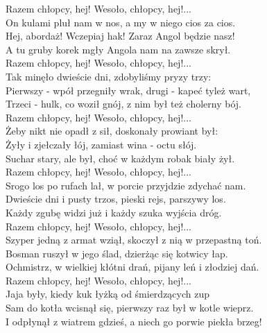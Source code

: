 Razem chłopcy, hej! Wesoło, chłopcy, hej!... \\

On kulami pluł nam w nos, a my w niego cios za cios. \\
Hej, abordaż! Wczepiaj hak! Zaraz Angol będzie nasz! \\
A tu gruby korek mgły Angola nam na zawsze skrył. \\

Razem chłopcy, hej! Wesoło, chłopcy, hej!... \\

Tak minęło dwieście dni, zdobyliśmy pryzy trzy: \\
Pierwszy - wpół przegniły wrak, drugi - kapeć tyleż wart, \\
Trzeci - hulk, co woził gnój, z nim był też cholerny bój. \\

Razem chłopcy, hej! Wesoło, chłopcy, hej!... \\

Żeby nikt nie opadł z sił, doskonały prowiant był: \\
Żyły i zjełczały łój, zamiast wina - octu słój. \\
Suchar stary, ale był, choć w każdym robak biały żył. \\

Razem chłopcy, hej! Wesoło, chłopcy, hej!... \\

Srogo los po rufach lał, w porcie przyjdzie zdychać nam. \\
Dwieście dni i pusty trzos, pieski rejs, parszywy los. \\
Każdy zgubę widzi już i każdy szuka wyjścia dróg. \\

Razem chłopcy, hej! Wesoło, chłopcy, hej!... \\

Szyper jedną z armat wziął, skoczył z nią w przepastną toń. \\
Bosman ruszył w jego ślad, dzierżąc się kotwicy łap. \\
Ochmistrz, w wielkiej kłótni drań, pijany leń i złodziej dań. \\

Razem chłopcy, hej! Wesoło, chłopcy, hej!... \\

Jaja były, kiedy kuk łyżką od śmierdzących zup \\
Sam do kotła wcisnął się, pierwszy raz był w kotle wieprz. \\
I odpłynął z wiatrem gdzieś, a niech go porwie piekła brzeg! \\

